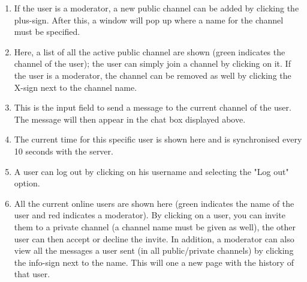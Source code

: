\documentclass[11pt]{article}
\begin{document}
\begin{enumerate}
	\item If the user is a moderator, a new public channel can be added by clicking the plus-sign. After this, a window will pop up where a name for the channel must be specified.
	\item Here, a list of all the active public channel are shown (green indicates the channel of the user); the user can simply join a channel by clicking on it. If the user is a moderator, the channel can be removed as well by clicking the X-sign next to the channel name.
	\item This is the input field to send a message to the current channel of the user. The message will then appear in the chat box displayed above.
	\item The current time for this specific user is shown here and is synchronised every 10 seconds with the server.
	\item A user can log out by clicking on his username and selecting the "Log out" option.
	\item All the current online users are shown here (green indicates the name of the user and red indicates a moderator). By clicking on a user, you can invite them to a private channel (a channel name must be given as well), the other user can then accept or decline the invite. In addition, a moderator can also view all the messages a user sent (in all public/private channels) by clicking the info-sign next to the name. This will one a new page with the history of that user.
\end{enumerate}
\end{document}
